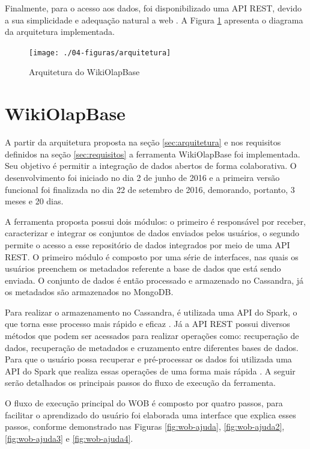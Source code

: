 Finalmente, para o acesso aos dados, foi disponibilizado uma API REST, devido a sua 
simplicidade e adequação natural a web \cite{maleshkova2010}. A Figura \ref{fig:arquitetura} apresenta o 
diagrama da arquitetura implementada.  

\begin{figure}[!htb]
    \centering
    \caption{Arquitetura do WikiOlapBase}
    \texttt{[image: ./04-figuras/arquitetura]}
    \label{fig:arquitetura}
\end{figure}

\section{WikiOlapBase}
\label{sec:wob}

A partir da arquitetura proposta na seção \ref{sec:arquitetura} e nos requisitos definidos
na seção \ref{sec:requisitos} a ferramenta WikiOlapBase foi implementada. Seu objetivo é
permitir a integração de dados abertos de forma colaborativa. O desenvolvimento foi iniciado
no dia 2 de junho de 2016 e a primeira versão funcional foi finalizada no dia 22 de setembro
de 2016, demorando, portanto, 3 meses e 20 dias.

A ferramenta proposta possui dois módulos: o primeiro é responsável por receber, caracterizar
e integrar os conjuntos de dados enviados pelos usuários, o segundo permite o acesso a esse 
repositório de dados integrados por meio de uma API REST. O primeiro módulo é composto por 
uma série de interfaces, nas quais os usuários preenchem os metadados referente a base de 
dados que está sendo enviada. O conjunto de dados é então processado e armazenado no 
Cassandra, já os metadados são armazenados no MongoDB. 

Para realizar o armazenamento no Cassandra, é utilizada uma API do Spark, o que torna esse 
processo mais rápido e eficaz \cite{kolaczkowski2014}. Já a API REST possui diversos métodos 
que podem ser acessados para realizar operações como: recuperação de dados, recuperação de 
metadados e cruzamento entre diferentes bases de dados. Para que o usuário possa recuperar 
e pré-processar os dados foi utilizada uma API do Spark que realiza essas operações de uma 
forma mais rápida \cite{kolaczkowski2014}. A seguir serão detalhados os principais passos 
do fluxo de execução da ferramenta.

O fluxo de execução principal do WOB é composto por quatro passos, para facilitar o 
aprendizado do usuário foi elaborada uma interface que explica esses passos, conforme
demonstrado nas Figuras \ref{fig:wob-ajuda}, \ref{fig:wob-ajuda2}, \ref{fig:wob-ajuda3} e
 \ref{fig:wob-ajuda4}.


